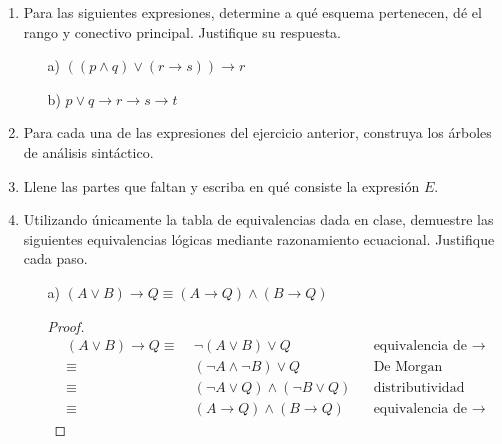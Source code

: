 \documentclass[letterpaper,11pt]{article}
\begin{document}
\begin{enumerate}
    \item Para las siguientes expresiones, determine a qué esquema pertenecen,
    dé el rango y conectivo principal. Justifique su respuesta.

    \begin{itemize}
        \item[a)] $((p \land q) \lor (r → s)) → r$
        \item[b)] $p \lor q → r → s → t$
    \end{itemize}

    \item Para cada una de las expresiones del ejercicio anterior, construya
    los árboles de análisis sintáctico.

    \item Llene las partes que faltan y escriba en qué consiste la expresión 
    $E$.

    \item Utilizando únicamente la tabla de equivalencias dada en clase, 
    demuestre las siguientes equivalencias lógicas mediante razonamiento 
    ecuacional. Justifique cada paso.

    \begin{itemize}
        \item[a)] $(A \lor B) → Q ≡ (A → Q) \land (B → Q)$ 
        \begin{proof}
            \begin{align*}
                (A \lor B) → Q 
                ≡& \; \neg (A \lor B) \lor Q  
                && \text{equivalencia de $→$} \\
                ≡& \; (\neg A \land \neg B) \lor Q 
                && \text{De Morgan} \\ 
                ≡& \; (\neg A \lor Q) \land (\neg B \lor Q)
                && \text{distributividad} \\ 
                ≡& \; (A → Q) \land (B → Q)
                && \text{equivalencia de $→$} 
            \end{align*}
        \end{proof}


\end{itemize}
\end{enumerate}
\end{document}
